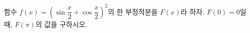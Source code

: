 함수 $f(x)=\left(\sin\dfrac{x}{2}+\cos\dfrac{x}{2}\right)^2$의 한 부정적분을 $F(x)$라 하자. $F(0)=0$일 때, $F(\pi)$의 값을 구하시오.
